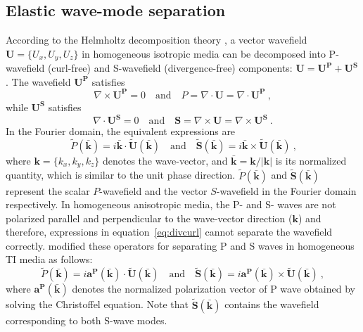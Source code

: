 \subsection{Elastic wave-mode separation}
According to the Helmholtz decomposition theory \cite[]{akirichards}, a vector wavefield $\mathbf{U}=\{U_x,U_y,U_z\}$ in homogeneous isotropic media can
be decomposed into P-wavefield (curl-free) and S-wavefield (divergence-free) components: $\mathbf{U} =\mathbf{U^P}+\mathbf{U^S} $. The wavefield $\mathbf{U^P}$ satisfies
\begin{equation}
\label{eq:p}
\nabla\times\mathbf{U^P} = 0\quad\mbox{and}\quad P = \nabla\cdot\mathbf{U} = \nabla\cdot\mathbf{U^P}~,
\end{equation}
while $\mathbf{U^S}$ satisfies
\begin{equation}
\label{eq:s}
\nabla\cdot\mathbf{U^S} = 0\quad\mbox{and}\quad \mathbf{S}=\nabla\times\mathbf{U} = \nabla\times\mathbf{U^S}~.
\end{equation}
In the Fourier domain, the equivalent expressions are 
\begin{equation}
\label{eq:divcurl}\
\widetilde{P}\mathbf{(\bar{k})} = i\mathbf{\bar{k}}\cdot\mathbf{\widetilde{U}(\bar{k})}\quad\mbox{and}\quad\mathbf{\widetilde{S}(\bar{k})} = i\mathbf{\bar{k}}\times\mathbf{\widetilde{U}(\bar{k})}~,
\end{equation}
where $\mathbf{k}=\{k_x,k_y,k_z\}$ denotes the wave-vector, and $\mathbf{\bar{k}} = \mathbf{k/|k|}$ is its normalized quantity, which is similar to the unit phase direction. $\widetilde{P}\mathbf{(\bar{k})}$ and $\mathbf{\widetilde{S}(\bar{k})}$ represent the scalar $P$-wavefield and the vector $S$-wavefield in the Fourier domain respectively. In homogeneous anisotropic media, the P- and S- waves are not polarized parallel and perpendicular to the wave-vector direction ($\mathbf{k}$) and therefore, expressions in equation~\ref{eq:divcurl} cannot separate the wavefield correctly. \cite{joejohn} modified these operators for separating P and S waves in homogeneous TI media as follows:
\begin{equation}
\label{eq:joejohn}
\widetilde{P}\mathbf{(\bar{k})} = i\mathbf{a^{P}(\mathbf{\bar{k}})}\cdot\mathbf{\widetilde{U}(\bar{k})}\quad\mbox{and}\quad\mathbf{\widetilde{S}(\bar{k})} = i\mathbf{a^{P}(\mathbf{\bar{k}})}\times\mathbf{\widetilde{U}(\bar{k})}~, 
\end{equation}
where $\mathbf{a^{P}(\mathbf{\bar{k}})}$ denotes the normalized polarization vector of P wave obtained by solving the Christoffel equation. Note that $\mathbf{\widetilde{S}(\bar{k})}$ contains the wavefield corresponding to both S-wave modes. 

